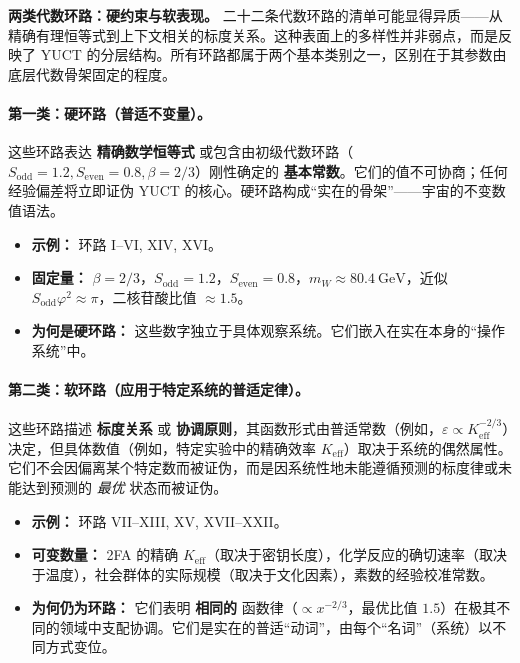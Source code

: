 \documentclass[12pt,a4paper]{article}
\begin{document}
	\vspace{0.5cm}
	\noindent
	\textbf{两类代数环路：硬约束与软表现。}
	二十二条代数环路的清单可能显得异质——从精确有理恒等式到上下文相关的标度关系。这种表面上的多样性并非弱点，而是反映了 YUCT 的分层结构。所有环路都属于两个基本类别之一，区别在于其参数由底层代数骨架固定的程度。
	
	\paragraph{第一类：硬环路（普适不变量）。}
	这些环路表达 \textbf{精确数学恒等式} 或包含由初级代数环路（\(S_{\mathrm{odd}}=1.2, S_{\mathrm{even}}=0.8, \beta=2/3\)）刚性确定的 \textbf{基本常数}。它们的值不可协商；任何经验偏差将立即证伪 YUCT 的核心。硬环路构成“实在的骨架”——宇宙的不变数值语法。
	\begin{itemize}
		\item \textbf{示例：} 环路 I--VI, XIV, XVI。
		\item \textbf{固定量：} \(\beta = 2/3\)，\(S_{\mathrm{odd}}=1.2\)，\(S_{\mathrm{even}}=0.8\)，\(m_W \approx 80.4\ \text{GeV}\)，近似 \(S_{\mathrm{odd}}\varphi^2 \approx \pi\)，二核苷酸比值 \(\approx 1.5\)。
		\item \textbf{为何是硬环路：} 这些数字独立于具体观察系统。它们嵌入在实在本身的“操作系统”中。
	\end{itemize}
	
	\paragraph{第二类：软环路（应用于特定系统的普适定律）。}
	这些环路描述 \textbf{标度关系} 或 \textbf{协调原则}，其函数形式由普适常数（例如，\(\varepsilon \propto K_{\mathrm{eff}}^{-2/3}\)）决定，但具体数值（例如，特定实验中的精确效率 \(K_{\mathrm{eff}}\)）取决于系统的偶然属性。它们不会因偏离某个特定数而被证伪，而是因系统性地未能遵循预测的标度律或未能达到预测的 \textit{最优} 状态而被证伪。
	\begin{itemize}
		\item \textbf{示例：} 环路 VII--XIII, XV, XVII--XXII。
		\item \textbf{可变数量：} 2FA 的精确 \(K_{\mathrm{eff}}\)（取决于密钥长度），化学反应的确切速率（取决于温度），社会群体的实际规模（取决于文化因素），素数的经验校准常数。
		\item \textbf{为何仍为环路：} 它们表明 \textbf{相同的} 函数律（\(\propto x^{-2/3}\)，最优比值 \(1.5\)）在极其不同的领域中支配协调。它们是实在的普适“动词”，由每个“名词”（系统）以不同方式变位。
	\end{itemize}
	
\end{document}
